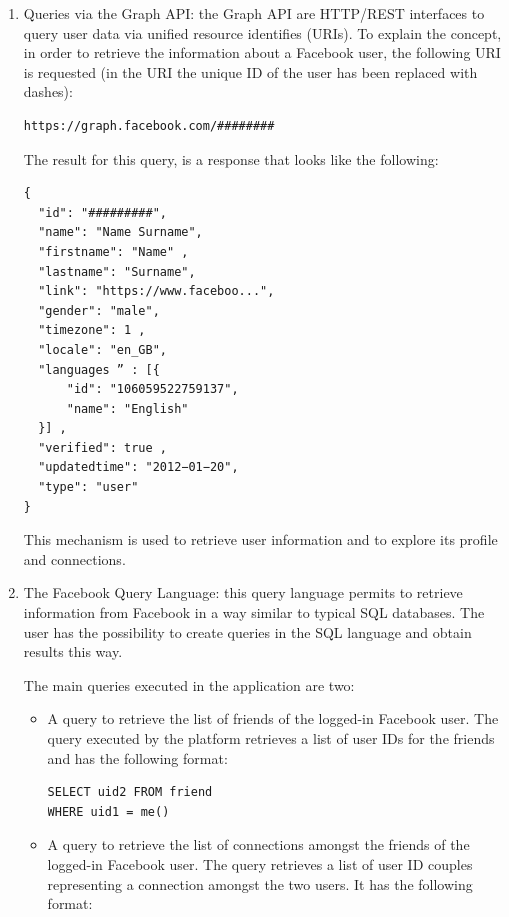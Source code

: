 \begin{enumerate}
\item Queries via the Graph API: the Graph API are HTTP/REST interfaces to query user data via unified resource identifies (URIs).
To explain the concept, in order to retrieve the information about a Facebook user, the following URI is requested (in the URI the unique ID of the user has been
replaced with dashes):

\begin{lstlisting}
https://graph.facebook.com/########
\end{lstlisting}

The result for this query, is a response that looks like the following:

\begin{lstlisting}
{
  "id": "#########",
  "name": "Name Surname",
  "firstname": "Name" ,
  "lastname": "Surname",
  "link": "https://www.faceboo...",
  "gender": "male",
  "timezone": 1 ,
  "locale": "en_GB",
  "languages ” : [{
      "id": "106059522759137",
      "name": "English"
  }] ,
  "verified": true ,
  "updatedtime": "2012−01−20",
  "type": "user"
}
\end{lstlisting}

This mechanism is used to retrieve user information and to explore its profile and connections.

\item The Facebook Query Language: this query language permits to retrieve information from Facebook in a way similar to typical SQL databases.
The user has the possibility to create queries in the SQL language and obtain results this way.

The main queries executed in the application are two:
\begin{itemize}
\item A query to retrieve the list of friends of the logged-in Facebook user.
The query executed by the platform retrieves a list of user IDs for the friends and has the following format:

\begin{lstlisting}
SELECT uid2 FROM friend
WHERE uid1 = me()
\end{lstlisting}

\item A query to retrieve the list of connections amongst the friends of the logged-in Facebook user.
The query retrieves a list of user ID couples representing a connection amongst the two users.
It has the following format:


\end{itemize}
\end{enumerate}
